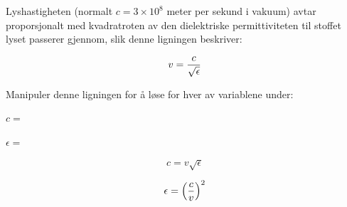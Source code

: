 

Lyshastigheten (normalt $c = 3 \times 10^8$ meter per sekund i vakuum) avtar proporsjonalt med kvadratroten av den dielektriske permittiviteten til stoffet lyset passerer gjennom, slik denne ligningen beskriver:

$$v = {c \over \sqrt{\epsilon}}$$

Manipuler denne ligningen for å løse for hver av variablene under:

\vskip 10pt

$c =$

\vskip 10pt

$\epsilon =$

\vskip 10pt







$$c = v \sqrt{\epsilon}$$

$$\epsilon = \left({c \over v}\right)^2$$










